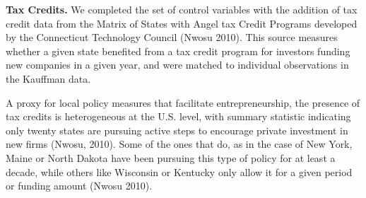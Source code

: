 \textbf{Tax Credits.} We completed the set of control variables with the addition of tax credit data from the Matrix of States with Angel tax Credit Programs developed by the Connecticut Technology Council (Nwosu 2010). This source measures whether a given state benefited from a tax credit program for investors funding new companies in a given year, and were matched to individual observations in the Kauffman data.

A proxy for local policy measures that facilitate entrepreneurship, the presence of tax credits is heterogeneous at the U.S. level, with summary statistic indicating only twenty states are pursuing active steps to encourage private investment in new firms (Nwosu, 2010). Some of the ones that do, as in the case of New York, Maine or North Dakota have been pursuing this type of policy for at least a decade, while others like Wisconsin or Kentucky only allow it for a given period or funding amount (Nwosu 2010). 


